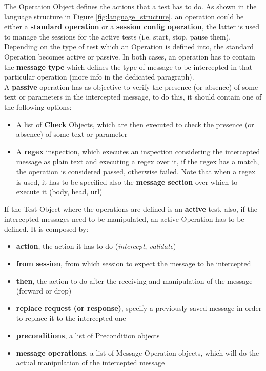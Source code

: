 The Operation Object defines the actions that a test has to do. As shown in the language structure in Figure \ref{fig:language_structure}, an operation could be either a \textbf{standard operation} or a \textbf{session config operation}, the latter is used to manage the sessions for the active tests (i.e. start, stop, pause them). Depending on the type of test which an Operation is defined into, the standard Operation becomes active or passive.
In both cases, an operation has to contain the \textbf{message type} which defines the type of message to be intercepted in that particular operation (more info in the dedicated paragraph).
\\A \textbf{passive} operation has as objective to verify the presence (or absence) of some text or parameters in the intercepted message, to do this, it should contain one of the following options:
\begin{itemize}
    \item A list of \textbf{Check} Objects, which are then executed to check the presence (or absence) of some text or parameter
    \item A \textbf{regex} inspection, which executes an inspection considering the intercepted message as plain text and executing a regex over it, if the regex has a match, the operation is considered passed, otherwise failed. Note that when a regex is used, it has to be specified also the \textbf{message section} over which to execute it (body, head, url)
\end{itemize}

If the Test Object where the operations are defined is an \textbf{active} test, also, if the intercepted messages need to be manipulated, an active Operation has to be defined. It is composed by:
\begin{itemize}
    \item \textbf{action}, the action it has to do (\textit{intercept}, \textit{validate})
    \item \textbf{from session}, from which session to expect the message to be intercepted
    \item \textbf{then}, the action to do after the receiving and manipulation of the message (forward or drop)
    \item \textbf{replace request (or response)}, specify a previously saved message in order to replace it to the intercepted one
    \item \textbf{preconditions}, a list of Precondition objects
    \item \textbf{message operations}, a list of Message Operation objects, which will do the actual manipulation of the intercepted message
\end{itemize}

